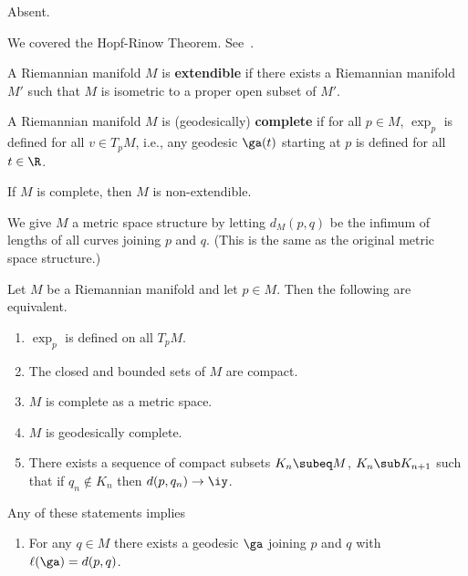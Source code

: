 
Absent.

We covered the Hopf-Rinow Theorem. See~\cite[p. 144-149]{dC}.

\begin{df}
A Riemannian manifold $M$ is \textbf{extendible} if there exists a Riemannian manifold $M'$ such that $M$ is isometric to a proper open subset of $M'$.

A Riemannian manifold $M$ is (geodesically) \textbf{complete} if for all $p\in M$, $\exp_p$ is defined for all $v\in T_pM$, i.e., any geodesic $\ga(t)$ starting at $p$ is defined for all $t\in \R$.
\end{df}

\begin{pr}
If $M$ is complete, then $M$ is non-extendible.
\end{pr}

We give $M$ a metric space structure by letting $d_M(p,q)$ be the infimum of lengths of all curves joining $p$ and $q$. (This is the same as the original metric space structure.)

\begin{thm}
Let $M$ be a Riemannian manifold and let $p\in M$. Then the following are equivalent.
\begin{enumerate}
\item
$\exp_p$ is defined on all $T_pM$.
\item
The closed and bounded sets of $M$ are compact.
\item
$M$ is complete as a metric space.
\item
$M$ is geodesically complete.
\item
There exists a sequence of compact subsets $K_n\subeq M$, $K_n\sub K_{n+1}$ such that if $q_n\nin K_n$ then $d(p,q_n)\to \iy$.
\end{enumerate}
Any of these statements implies
\begin{enumerate}[resume]
\item
For any $q\in M$ there exists a geodesic $\ga$ joining $p$ and $q$ with $\ell(\ga)=d(p,q)$.
\end{enumerate}
\end{thm}